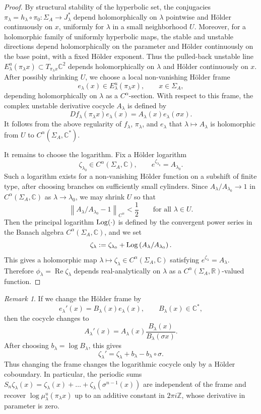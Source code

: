 \documentclass[11pt]{amsart}
\theoremstyle{plain}
\theoremstyle{definition}
\theoremstyle{remark}
\newtheorem{rmk}[thm]{Remark}
\begin{document}
\begin{proof}
By structural stability of the hyperbolic set, the conjugacies $ \pi_\lambda=h_\lambda\circ\pi_0\colon \Sigma_A\to J_\lambda^\ast$ depend holomorphically on $\lambda$ pointwise and H\"older continuously on $x$, uniformly for $\lambda$ in a small neighborhood $U$. Moreover, for a holomorphic family of uniformly hyperbolic maps, the stable and unstable directions depend holomorphically on the parameter and H\"older continuously on the base point, with a fixed H\"older exponent. Thus the pulled-back unstable line $ E^u_\lambda(\pi_\lambda x)\subset T_{\pi_\lambda x}\mathbb C^2$ 
depends holomorphically on $\lambda$ and H\"older continuously on $x$. After possibly
shrinking $U$, we choose a local non-vanishing H\"older frame $$ e_\lambda(x)\in E^u_\lambda(\pi_\lambda x), \qquad x\in\Sigma_A, $$ depending holomorphically on $\lambda$ as a $C^\alpha$-section. With respect to this frame, the complex unstable derivative cocycle $A_\lambda$ is defined by $$ Df_\lambda(\pi_\lambda x)e_\lambda(x) = A_\lambda(x)e_\lambda(\sigma x). $$ 
It follows from the above regularity
of $f_\lambda$, $\pi_\lambda$, and $e_\lambda$ 
that $\lambda\mapsto A_\lambda$ is holomorphic from $U$ to $C^\alpha(\Sigma_A,\mathbb C^\ast)$.

It remains to choose the logarithm. Fix a H\"older logarithm
$$
\zeta_{\lambda_0}\in C^\alpha(\Sigma_A,\mathbb C),
        \qquad
e^{\zeta_{\lambda_0}}=A_{\lambda_0}.
$$
Such a logarithm exists for a non-vanishing H\"older function on a subshift of
finite type, after choosing branches on sufficiently small cylinders. Since
$A_\lambda/A_{\lambda_0}\to 1$ in
$C^\alpha(\Sigma_A,\mathbb C)$
as $\lambda\to\lambda_0$, we may shrink $U$ so that
$$
\left\|A_\lambda/A_{\lambda_0}-1\right\|_{C^\alpha}<\frac12
\qquad\text{for all }\lambda\in U.
$$
Then the principal logarithm 
${\rm Log} (\cdot)$
is defined by the convergent power series in the
Banach algebra $C^\alpha(\Sigma_A,\mathbb C)$, and we set
$$
\zeta_\lambda :=
\zeta_{\lambda_0} +
{\rm Log}\left(A_\lambda/A_{\lambda_0}\right).
$$
This gives a holomorphic map
$\lambda\mapsto \zeta_\lambda
\in C^\alpha(\Sigma_A,\mathbb C)$
satisfying $e^{\zeta_\lambda}=A_\lambda$. Therefore
$\phi_\lambda=\operatorname{Re}\zeta_\lambda$
depends real-analytically on $\lambda$ as a
$C^\alpha(\Sigma_A,\mathbb R)$-valued function.
\end{proof}

\begin{rmk}\label{rmk:frame-cobdry}
If we change the H\"older frame by
$$
e_\lambda'(x)=B_\lambda(x)e_\lambda(x),
\qquad B_\lambda(x)\in\mathbb C^\ast,
$$
then the cocycle changes to
$$
A_\lambda'(x) =
A_\lambda(x)\frac{B_\lambda(x)}{B_\lambda(\sigma x)}.
$$
After choosing $b_\lambda=\log B_\lambda$, this gives
$$
\zeta_\lambda'
=
\zeta_\lambda+b_\lambda-b_\lambda\circ\sigma.
$$
Thus changing the frame changes the logarithmic cocycle only by a H\"older
coboundary. In particular, the periodic sums
$S_n\zeta_\lambda(x)=
\zeta_\lambda(x) + \dots + \zeta_\lambda (\sigma^{n-1}(x))$
are independent of the frame and recover
$\log \mu_\lambda^u(\pi_\lambda x)
$
up to an additive constant in $2\pi i\mathbb Z$, whose derivative in parameter
is zero.
\end{rmk}
\end{document}
